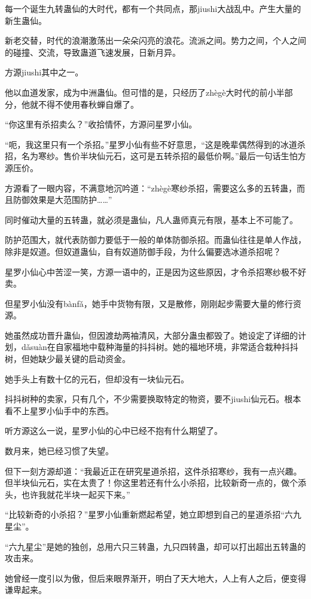 \begin{this_body}
每一个诞生九转蛊仙的大时代，都有一个共同点，那jiushi大战乱中。产生大量的新生蛊仙。

新老交替，时代的浪潮激荡出一朵朵闪亮的浪花。流派之间。势力之间，个人之间的碰撞、交流，导致蛊道飞速发展，日新月异。

方源jiushi其中之一。

他以血道发家，成为中洲蛊仙。但可惜的是，只经历了zhègè大时代的前小半部分，他就不得不使用春秋蝉自爆了。

“你这里有杀招卖么？”收拾情怀，方源问星罗小仙。

“呃，我这里只有一个杀招。”星罗小仙有些不好意思，“这是晚辈偶然得到的冰道杀招，名为寒纱。售价半块仙元石，这可是五转杀招的最低价啊。”最后一句话生怕方源压价。

方源看了一眼内容，不满意地沉吟道：“zhègè寒纱杀招，需要这么多的五转蛊，而且防御效果是大范围防护……”

同时催动大量的五转蛊，就必须是蛊仙，凡人蛊师真元有限，基本上不可能了。

防护范围大，就代表防御力要低于一般的单体防御杀招。而蛊仙往往是单人作战，除非是奴道。但奴道蛊仙，自有奴道防御手段，为什么偏要选冰道杀招呢？

星罗小仙心中苦涩一笑，方源一语中的，正是因为这些原因，才令杀招寒纱极不好卖。

但星罗小仙没有bànfǎ，她手中货物有限，又是散修，刚刚起步需要大量的修行资源。

她虽然成功晋升蛊仙，但因渡劫两袖清风，大部分蛊虫都毁了。她设定了详细的计划，dǎsuàn在自家福地中载种海量的抖抖树。她的福地环境，非常适合栽种抖抖树，但她缺少最关键的启动资金。

她手头上有数十亿的元石，但却没有一块仙元石。

抖抖树种的卖家，只有几个，不少需要换取特定的物资，要不jiushi仙元石。根本看不上星罗小仙手中的东西。

听方源这么一说，星罗小仙的心中已经不抱有什么期望了。

数月来，她已经习惯了失望。

但下一刻方源却道：“我最近正在研究星道杀招，这件杀招寒纱，我有一点兴趣。但半块仙元石，实在太贵了！你这里若还有什么小杀招，比较新奇一点的，做个添头，也许我就花半块一起买下来。”

“比较新奇的小杀招？”星罗小仙重新燃起希望，她立即想到自己的星道杀招“六九星尘”。

“六九星尘”是她的独创，总用六只三转蛊，九只四转蛊，却可以打出超出五转蛊的攻击来。

她曾经一度引以为傲，但后来眼界渐开，明白了天大地大，人上有人之后，便变得谦卑起来。


\end{this_body}
